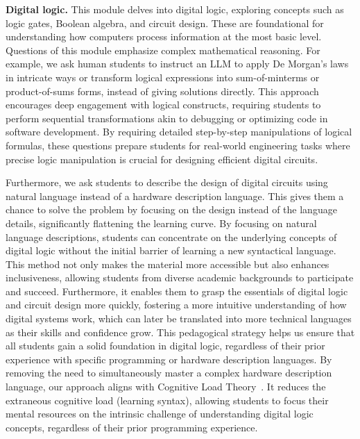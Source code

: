 \documentclass{article} %
\begin{document}
{\bf Digital logic.} This module delves into digital logic, exploring concepts
such as logic gates, Boolean algebra, and circuit design. These are foundational for understanding how computers process information at the most basic level. Questions of this module emphasize complex mathematical reasoning. For example, we ask human students to instruct an LLM to apply De Morgan’s laws in intricate ways or transform logical expressions into sum-of-minterms or product-of-sums forms, instead of giving solutions directly. This approach encourages deep engagement with logical constructs, requiring students to perform sequential transformations akin to debugging or optimizing code in software development. By requiring detailed step-by-step
manipulations of logical formulas, these questions prepare students for real-world engineering tasks where precise logic manipulation is crucial for designing efficient digital circuits.

Furthermore, we ask students to describe the design of digital circuits using
natural language instead of a hardware description language. This gives them a
chance to solve the problem by focusing on the design instead of the language
details, significantly flattening the learning curve. By focusing on natural language descriptions, students can concentrate on the underlying concepts of digital logic without the initial barrier of learning a new syntactical language. This method not only makes the material more accessible but also enhances inclusiveness, allowing students from diverse academic backgrounds to participate and succeed. Furthermore, it enables them to grasp the essentials of digital logic and circuit design more quickly, fostering a more intuitive understanding of how digital systems work, which can later be translated into more technical languages as their skills and confidence grow. This pedagogical strategy helps us ensure that all students gain a solid foundation in digital logic, regardless of their prior experience with specific programming or hardware description languages. By removing the need to simultaneously master a complex hardware description language, our approach aligns with Cognitive Load Theory~\citep{sweller2011cognitive}. It reduces the extraneous cognitive load (learning syntax), allowing students to focus their mental resources on the intrinsic challenge of understanding digital logic concepts, regardless of their prior programming experience. 
\end{document}
